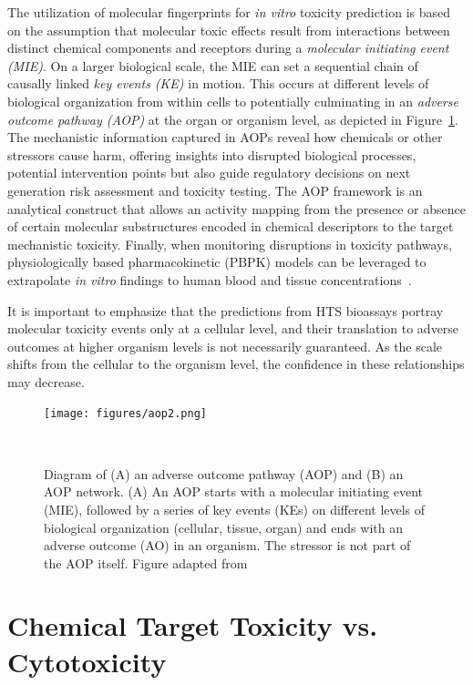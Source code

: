 The utilization of molecular fingerprints for \emph{in vitro} toxicity prediction is based on the assumption that molecular toxic effects result from interactions between distinct chemical components and receptors during a \emph{molecular initiating event (MIE)}. On a larger biological scale, the MIE can set a sequential chain of causally linked \emph{key events (KE)} in motion. This occurs at different levels of biological organization from within cells to potentially culminating in an \emph{adverse outcome pathway (AOP)} at the organ or organism level, as depicted in Figure~\ref{fig:aop}. The mechanistic information captured in AOPs reveal how chemicals or other stressors cause harm, offering insights into disrupted biological processes, potential intervention points but also guide regulatory decisions on next generation risk assessment and toxicity testing. The AOP framework is an analytical construct that allows an activity mapping from the presence or absence of certain molecular substructures encoded in chemical descriptors to the target mechanistic toxicity. Finally, when monitoring disruptions in toxicity pathways, physiologically based pharmacokinetic (PBPK) models can be leveraged to extrapolate \emph{in vitro} findings to human blood and tissue concentrations~\cite{bell2018}.

It is important to emphasize that the predictions from HTS bioassays portray molecular toxicity events only at a cellular level, and their translation to adverse outcomes at higher organism levels is not necessarily guaranteed. As the scale shifts from the cellular to the organism level, the confidence in these relationships may decrease.

\begin{figure}[htbp]  %
    \centering
    \texttt{[image: figures/aop2.png]}  
    \caption{Diagram of (A) an adverse outcome pathway (AOP) and (B) an AOP network. (A) An AOP starts with a molecular initiating event (MIE), followed by a series of key events (KEs) on different levels of biological organization (cellular, tissue, organ) and ends with an adverse outcome (AO) in an organism. The stressor is not part of the AOP itself. Figure adapted from~\cite{nymark2021}}
~\label{fig:aop} 
\end{figure}


\section{Chemical Target Toxicity vs. Cytotoxicity}\label{sec:cytotoxicity}

